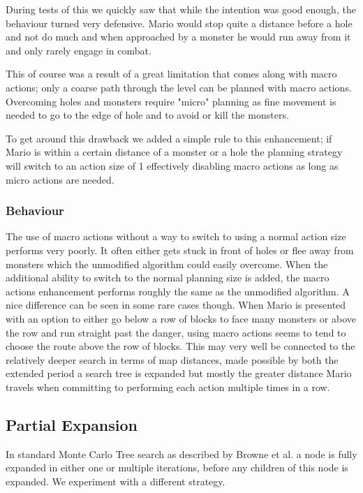 \documentclass[10pt,a4paper]{article}
\begin{document}
During tests of this we quickly saw that while the intention was good enough, the behaviour turned very defensive. Mario would stop quite a distance before a hole and not do much and when approached by a monster he would run away from it and only rarely engage in combat.

This of course was a result of a great limitation that comes along with macro actions; only a coarse path through the level can be planned with macro actions. Overcoming holes and monsters require "micro" planning as fine movement is needed to go to the edge of hole and to avoid or kill the monsters.

To get around this drawback we added a simple rule to this enhancement; if Mario is within a certain distance of a monster or a hole the planning strategy will switch to an action size of 1 effectively disabling macro actions as long as micro actions are needed.

\subsubsection{Behaviour}
The use of macro actions without a way to switch to using a normal action size performs very poorly. It often either gets stuck in front of holes or flee away from monsters which the unmodified algorithm could easily overcome. 
When the additional ability to switch to the normal planning size is added, the macro actions enhancement performs roughly the same as the unmodified algorithm. 
A nice difference can be seen in some rare cases though. When Mario is presented with an option to either go below a row of blocks to face many monsters or above the row and run straight past the danger, using macro actions seems to tend to choose the route above the row of blocks. 
This may very well be connected to the relatively deeper search in terms of map distances, made possible by both the extended period a search tree is expanded but mostly the greater distance Mario travels when committing to performing each action multiple times in a row.


\subsection{Partial Expansion}
In standard Monte Carlo Tree search as described by Browne et al. \cite{mctssurvey} %
a node is fully expanded in either one or multiple iterations, before any children of this node is expanded. We experiment with a different strategy.
\end{document}
